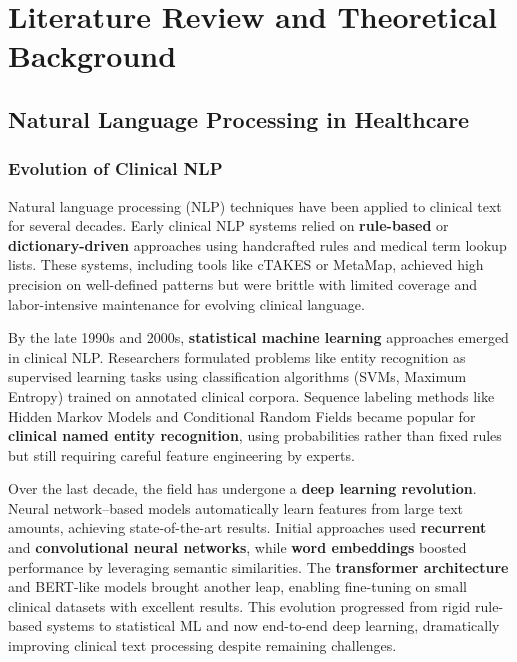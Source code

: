 
\chapter{Literature Review and Theoretical Background}
\label{chap:literature}

\section{Natural Language Processing in Healthcare}

\subsection{Evolution of Clinical NLP}

Natural language processing (NLP) techniques have been applied to clinical text for several decades. Early clinical NLP systems relied on \textbf{rule-based} or \textbf{dictionary-driven} approaches using handcrafted rules and medical term lookup lists. These systems, including tools like cTAKES or MetaMap, achieved high precision on well-defined patterns but were brittle with limited coverage and labor-intensive maintenance for evolving clinical language.

By the late 1990s and 2000s, \textbf{statistical machine learning} approaches emerged in clinical NLP. Researchers formulated problems like entity recognition as supervised learning tasks using classification algorithms (SVMs, Maximum Entropy) trained on annotated clinical corpora. Sequence labeling methods like Hidden Markov Models and Conditional Random Fields became popular for \textbf{clinical named entity recognition}, using probabilities rather than fixed rules but still requiring careful feature engineering by experts.

Over the last decade, the field has undergone a \textbf{deep learning revolution}. Neural network–based models automatically learn features from large text amounts, achieving state-of-the-art results. Initial approaches used \textbf{recurrent} and \textbf{convolutional neural networks}, while \textbf{word embeddings} boosted performance by leveraging semantic similarities. The \textbf{transformer architecture} and BERT-like models brought another leap, enabling fine-tuning on small clinical datasets with excellent results. This evolution progressed from rigid rule-based systems to statistical ML and now end-to-end deep learning, dramatically improving clinical text processing despite remaining challenges.


